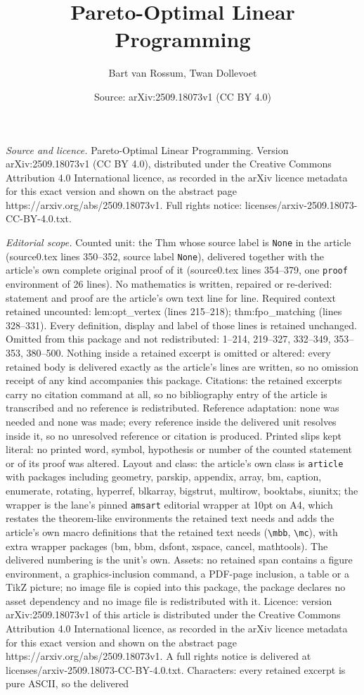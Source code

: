 \documentclass[10pt,a4paper]{amsart}
\title[Pareto-Optimal Linear Programming]{Pareto-Optimal Linear Programming}
\author{Bart van Rossum, Twan Dollevoet}
\date{Source: arXiv:2509.18073v1 (CC BY 4.0)}
\begin{document}
\maketitle

\noindent\emph{Source and licence.} Pareto-Optimal Linear Programming. Version arXiv:2509.18073v1 (CC BY 4.0), distributed under the Creative Commons Attribution 4.0 International licence, as recorded in the arXiv licence metadata for this exact version and shown on the abstract page https://arxiv.org/abs/2509.18073v1. Full rights notice: licenses/arxiv-2509.18073-CC-BY-4.0.txt.\par\smallskip

\noindent\textit{Editorial scope.} Counted unit: the Thm whose source label is \texttt{None} in the article (source0.tex lines 350--352, source label \texttt{None}), delivered together with the article's own complete original proof of it (source0.tex lines 354--379, one \texttt{proof} environment of 26 lines). No mathematics is written, repaired or re-derived: statement and proof are the article's own text line for line. Required context retained uncounted: lem:opt\_vertex (lines 215--218); thm:fpo\_matching (lines 328--331). Every definition, display and label of those lines is retained unchanged. Omitted from this package and not redistributed: 1--214, 219--327, 332--349, 353--353, 380--500. Nothing inside a retained excerpt is omitted or altered: every retained body is delivered exactly as the article's lines are written, so no omission receipt of any kind accompanies this package. Citations: the retained excerpts carry no citation command at all, so no bibliography entry of the article is transcribed and no reference is redistributed. Reference adaptation: none was needed and none was made; every reference inside the delivered unit resolves inside it, so no unresolved reference or citation is produced. Printed slips kept literal: no printed word, symbol, hypothesis or number of the counted statement or of its proof was altered. Layout and class: the article's own class is \texttt{article} with packages including geometry, parskip, appendix, array, bm, caption, enumerate, rotating, hyperref, blkarray, bigstrut, multirow, booktabs, siunitx; the wrapper is the lane's pinned \texttt{amsart} editorial wrapper at 10pt on A4, which restates the theorem-like environments the retained text needs and adds the article's own macro definitions that the retained text needs (\texttt{\textbackslash mbb}, \texttt{\textbackslash mc}), with extra wrapper packages (bm, bbm, dsfont, xspace, cancel, mathtools). The delivered numbering is the unit's own. Assets: no retained span contains a figure environment, a graphics-inclusion command, a PDF-page inclusion, a table or a TikZ picture; no image file is copied into this package, the package declares no asset dependency and no image file is redistributed with it. Licence: version arXiv:2509.18073v1 of this article is distributed under the Creative Commons Attribution 4.0 International licence, as recorded in the arXiv licence metadata for this exact version and shown on the abstract page https://arxiv.org/abs/2509.18073v1. A full rights notice is delivered at licenses/arxiv-2509.18073-CC-BY-4.0.txt. Characters: every retained excerpt is pure ASCII, so the delivered 
\end{document}
